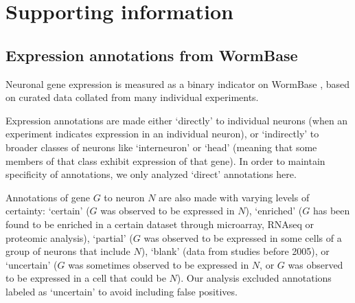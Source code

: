 \documentclass[10pt,letterpaper]{article}
\begin{document}
{%




\newpage
\section*{Supporting information}
\setcounter{figure}{0} \renewcommand{\thefigure}{S\arabic{figure}}
\renewcommand{\thefigure}{S\arabic{figure}}

\subsection*{Expression annotations from WormBase}

Neuronal gene expression is measured as a binary indicator on WormBase \cite{Harris:2009kd}, based on curated data collated from many individual experiments.

Expression annotations are made either `directly' to individual neurons (when an experiment indicates expression in an individual neuron), or `indirectly' to broader classes of neurons like `interneuron' or `head' (meaning that some members of that class exhibit expression of that gene).
In order to maintain specificity of annotations, we only analyzed `direct' annotations here.

Annotations of gene $G$ to neuron $N$ are also made with varying levels of certainty:
`certain' ($G$ was observed to be expressed in $N$),
`enriched' ($G$ has been found to be enriched in a certain dataset through microarray, RNAseq or proteomic analysis),
`partial' ($G$ was observed to be expressed in some cells of a group of neurons that include $N$),
`blank' (data from studies before 2005),
or `uncertain' ($G$ was sometimes observed to be expressed in $N$, or $G$ was observed to be expressed in a cell that could be $N$).
Our analysis excluded annotations labeled as `uncertain' to avoid including false positives.

}
\end{document}
